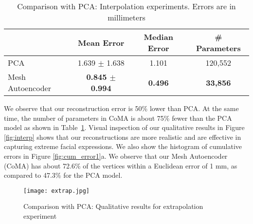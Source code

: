 \begin{table}
\begin{center}
\caption{Comparison with PCA: Interpolation experiments. Errors are in millimeters}
\begin{tabular}{l|cc|c}
     &  Mean Error      & Median Error & \# Parameters \\ \hline
PCA  & 1.639 $\pm$ 1.638 & 1.101& 120,552 \\
Mesh Autoencoder  & \textbf{0.845 $\pm$ 0.994} & \textbf{0.496}  & \textbf{33,856}\\
\end{tabular}
\label{tab:interp}
\end{center}
\end{table}

We observe that our reconstruction error is 50\% lower than PCA. At the same time, the number of parameters in CoMA is about 75\% fewer than the PCA model as shown in Table~\ref{tab:interp}. Visual inspection of our qualitative results in Figure \ref{fig:interp} shows that our reconstructions are more realistic and are effective in capturing extreme facial expressions. We also show the histogram of cumulative errors in Figure \ref{fig:cum_error1}a. We observe that our Mesh Autoencoder (CoMA) has about 72.6\% of the vertices within a Euclidean error of 1 mm, as compared to 47.3\% for the PCA model.



\begin{figure}[h]
\begin{center}
\texttt{[image: extrap.jpg]}
\end{center}
\caption{Comparison with PCA: Qualitative results for extrapolation experiment}
\label{fig:extrap}
\end{figure}


